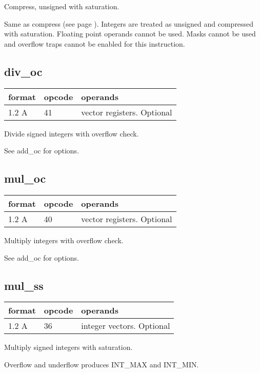 \documentclass[forwardcom.tex]{subfiles}
\begin{document}
Compress, unsigned with saturation.
\vv

Same as compress (see page \pageref{table:compressInstruction}). Integers are treated as unsigned and compressed with saturation. Floating point operands cannot be used.
Masks cannot be used and overflow traps cannot be enabled for this instruction.
\vv


\subsection{div\_oc}
\label{table:divOcInstruction}
\begin{tabular}{|p{12mm}|p{15mm}|p{100mm}|}
\hline
\bfseries format & \bfseries opcode & \bfseries operands \\ \hline
1.2 A & 41 & vector registers. Optional \\ \hline
\end{tabular}
\vv

Divide signed integers with overflow check.

See add\_oc for options.
\vv

\subsection{mul\_oc}
\label{table:mulOcInstruction}
\begin{tabular}{|p{12mm}|p{15mm}|p{100mm}|}
\hline
\bfseries format & \bfseries opcode & \bfseries operands \\ \hline
1.2 A & 40 & vector registers. Optional \\ \hline
\end{tabular}
\vv

Multiply integers with overflow check.

See add\_oc for options.
\vv

\subsection{mul\_ss}
\label{table:mulSsInstruction}
\begin{tabular}{|p{12mm}|p{15mm}|p{100mm}|}
\hline
\bfseries format & \bfseries opcode & \bfseries operands \\ \hline
1.2 A & 36 & integer vectors. Optional \\ \hline
\end{tabular}
\vv

Multiply signed integers with saturation.

Overflow and underflow produces INT\_MAX and INT\_MIN.
\vv
\end{document}
